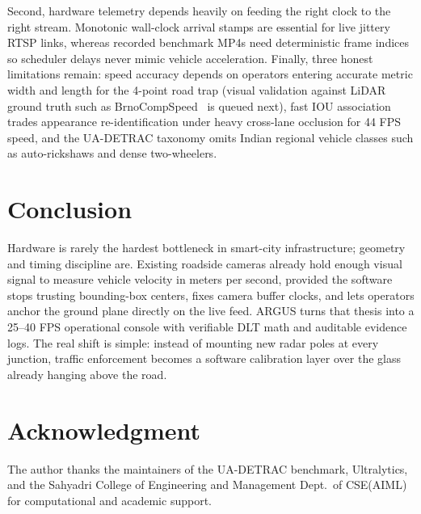 \documentclass[conference]{IEEEtran}
\begin{document}
Second, hardware telemetry depends heavily on feeding the right clock to the right stream. Monotonic wall-clock arrival stamps are essential for live jittery RTSP links, whereas recorded benchmark MP4s need deterministic frame indices so scheduler delays never mimic vehicle acceleration. Finally, three honest limitations remain: speed accuracy depends on operators entering accurate metric width and length for the 4-point road trap (visual validation against LiDAR ground truth such as BrnoCompSpeed~\cite{sochor2018brnocompspeed} is queued next), fast IOU association trades appearance re-identification under heavy cross-lane occlusion for 44 FPS speed, and the UA-DETRAC taxonomy omits Indian regional vehicle classes such as auto-rickshaws and dense two-wheelers.

\section{Conclusion}
Hardware is rarely the hardest bottleneck in smart-city infrastructure; geometry and timing discipline are. Existing roadside cameras already hold enough visual signal to measure vehicle velocity in meters per second, provided the software stops trusting bounding-box centers, fixes camera buffer clocks, and lets operators anchor the ground plane directly on the live feed. ARGUS turns that thesis into a 25--40 FPS operational console with verifiable DLT math and auditable evidence logs. The real shift is simple: instead of mounting new radar poles at every junction, traffic enforcement becomes a software calibration layer over the glass already hanging above the road.

\section*{Acknowledgment}
The author thanks the maintainers of the UA-DETRAC benchmark, Ultralytics, and the Sahyadri College of Engineering and Management Dept.\ of CSE(AIML) for computational and academic support.
\end{document}
